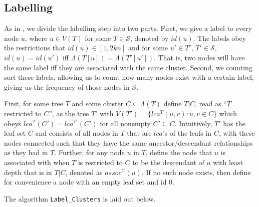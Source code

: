 \documentclass{article}
\newcommand{\leafset}{\Lambda}
\begin{document}
    \subsection{Labelling}
    As in \cite{gawrychowski2017faster}, we divide the labelling step into two parts. First, we give a label to every node $u$, where $u \in V(T)$ for some $T \in \mathcal{S}$, denoted by $id(u)$. The labels obey the restrictions that $id(u) \in [1, 2kn]$ and for some $u' \in T'$, $T' \in \mathcal{S}$, $id(u) = id(u')$ iff $\leafset(T[u]) = \leafset(T'[u'])$. That is, two nodes will have the same label iff they are associated with the same cluster. Second, we counting sort these labels, allowing us to count how many nodes exist with a certain label, giving us the frequency of those nodes in $\mathcal{S}$.

    First, for some tree $T$ and some cluster $C \subseteq \leafset(T)$ define $T|C$, read as ``$T$ restricted to $C$'', as the tree $T'$ with $V(T') = \{lca^T(u, v) : u, v \in C\}$ which obeys $lca^T(C') = lca^{T'}(C')$ for all nonempty $C' \subseteq C$. Intuitively, $T'$ has the leaf set $C$ and consists of all nodes in $T$ that are $lca$'s of the leafs in $C$, with these nodes connected such that they have the same ancestor/descendant relationships as they had in $T$. Further, for any node $u$ in $T$, define the node that $u$ is associated with when $T$ is restricted to $C$ to be the descendant of $u$ with least depth that is in $T|C$, denoted as $assoc^{C}(u)$. If no such node exists, then define for convenience a node with an empty leaf set and id $0$.

    The algorithm \texttt{Label\_Clusters} is laid out below.
\end{document}
